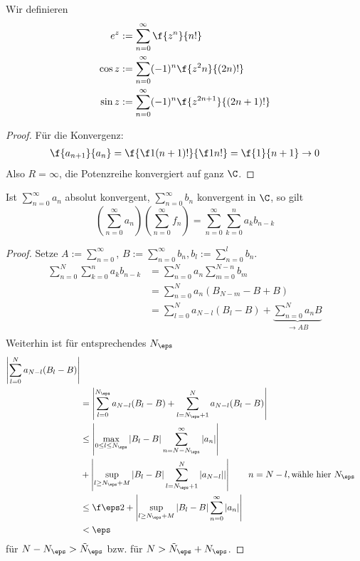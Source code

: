 \documentclass[a4paper,10pt]{scrartcl}
\begin{document}
\begin{df}
	Wir definieren
	\begin{align*}
		e^z &:= \sum_{n=0}^\infty \f {z^n}{n!}\\
		\cos z &:= \sum_{n=0}^\infty (-1)^n \f {z^2n}{(2n)!} \\
		\sin z &:= \sum_{n=0}^\infty (-1)^n \f{z^{2n+1}}{(2n+1)!}
	\end{align*}
	\begin{proof}
		Für die Konvergenz:
		\begin{align*}
			\f {a_{n+1}}{a_n} = \f {\f1{(n+1)!}}{\f 1{n!}} = \f {1}{n+1} \to 0
		\end{align*}
		Also $R=\infty$, die Potenzreihe konvergiert auf ganz $\C$.		
	\end{proof}
\end{df}

\begin{thm}
	\label{thm:1.18}
	Ist $\sum_{n=0}^\infty a_n$ absolut konvergent, $\sum_{n=0}^\infty b_n$ konvergent in $\C$, so gilt
	\[
		\left( \sum_{n=0}^\infty a_n\right) \left(\sum_{n=0}^\infty f_n\right) = \sum_{n=0}^\infty \sum_{k=0}^n a_k b_{n-k}
	\]
	\begin{proof}
		Setze $A:= \sum_{n=0}^\infty$, $B:= \sum_{n=0}^\infty b_n, b_l := \sum_{n=0}^l b_n$.
		\begin{align*}
			\sum_{n=0}^N \sum_{k=0}^n a_k b_{n-k}
				&= \sum_{n=0}^N a_n \sum_{m=0}^{N-n} b_m\\
				&= \sum_{n=0}^N a_n (B_{N-m}-B + B)\\
				&= \sum_{l=0}^N a_{N-l} (B_l -B) + \underbrace{\sum_{n=0}^N a_nB}_{\to AB}\\
		\end{align*}
		Weiterhin ist für entsprechendes $N_\eps$
		\begin{align*}
			\left|\sum_{l=0}^N a_{N-l} (B_l-B) \right| \\
				&= \left|\sum_{l=0}^{N_\eps} a_{N-l}(B_l-B) + \sum_{l=N_\eps +1}^N a_{N-l}(B_l-B)\right|\\
				&\le \left|\max_{0\le l \le N_\eps} |B_l-B|\sum_{n=N-N_\eps}^\infty |a_n| \right| \\ &+     \left|\sup_{l\ge N_{\eps}+M} |B_l-B| \sum_{l=N_\eps+1}^N |a_{N-l}| |\right| \qquad n= N-l, \text{wähle hier $N_\eps$} \\
				&\le \f \eps 2  +  \left|\sup_{l\ge N_{\eps}+M} |B_l-B| \sum_{n=0}^\infty |a_{n}| \right| \\
				&<     \eps
		\end{align*}
		für $N-N_\eps > \tilde N_\eps$ bzw. für  $N>\tilde N_\eps + N_\eps$.
	\end{proof}
\end{thm}
\end{document}
